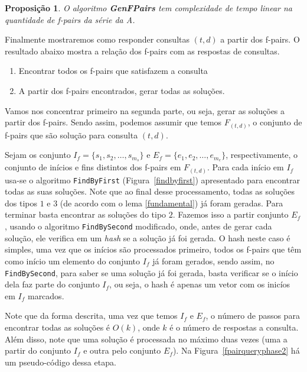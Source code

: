 \documentclass[12pt]{article}
\newtheorem{prop}[thm]{Proposição}
\begin{document}
\begin{prop}
O algoritmo {\bf GenFPairs} tem complexidade de tempo linear na quantidade
de f-pairs da série da A.
\end{prop}

Finalmente mostraremos como responder consultas $(t, d)$ a partir dos f-pairs.
O resultado abaixo mostra a relação dos f-pairs com as respostas de consultas.

\begin{enumerate}
\item Encontrar todos os f-pairs que satisfazem a consulta 
\item A partir dos f-pairs encontrados, gerar todas as soluções.
\end{enumerate}

Vamos nos concentrar primeiro na segunda parte, ou seja, gerar as soluções
a partir dos f-pairs. Sendo assim, podemos assumir que temos 
$F_{(t,d)}$, o conjunto de f-pairs que são solução para
consulta $(t,d)$. 

Sejam os conjunto $I_f = \{s_1, s_2, \ldots, s_{m_s}\}$
e $E_f = \{e_1, e_2, \ldots, e_{m_e}\}$, respectivamente, o conjunto de inícios e fins distintos
dos f-pairs em $F_{(t,d)}$. Para cada início em $I_f$ usa-se o algoritmo \verb|FindByFirst| (Figura~\ref{findbyfirst})
apresentado para encontrar todas as suas soluções.  Note que ao final desse processamento, todas
as soluções dos tipos $1$ e $3$ (de acordo com o lema \ref{fundamental}) já foram geradas. Para terminar
basta encontrar as soluções do tipo $2$. Fazemos isso  a partir conjunto $E_f$, usando o algoritmo
\verb|FindBySecond| modificado, onde, antes de gerar cada solução, ele verifica em um \textit{hash} se a solução
já foi gerada. O hash neste caso é simples, uma vez que os inícios são processados primeiro, todos os
f-pairs que têm como início um elemento do conjunto $I_f$ já foram gerados, sendo assim, no \verb|FindBySecond|,
para saber se uma solução já foi gerada, basta verificar se o início dela faz parte do conjunto $I_f$, ou seja,
o hash é apenas um vetor com os inicíos em $I_f$ marcados.

Note que da forma descrita, uma vez que temos $I_f$ e $E_f$, o número de passos para encontrar todas as soluções é $O(k)$, onde $k$ é o número de respostas a consulta.
Além disso, note que uma solução é processada no máximo duas vezes (uma a partir do conjunto $I_f$ e outra pelo conjunto $E_f$).
Na Figura~\ref{fpairqueryphase2} há um pseudo-código dessa etapa.
\end{document}
